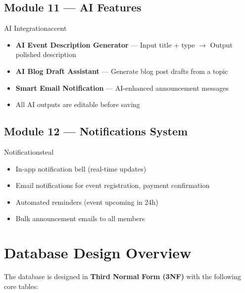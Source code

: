 \documentclass[12pt,a4paper]{article}
\begin{document}
\subsection{Module 11 --- AI Features}
\begin{modulebox}{AI Integration}{accent}
\begin{itemize}[leftmargin=*, itemsep=3pt]
  \item \textbf{AI Event Description Generator} --- Input title + type $\rightarrow$ Output polished description
  \item \textbf{AI Blog Draft Assistant} --- Generate blog post drafts from a topic
  \item \textbf{Smart Email Notification} --- AI-enhanced announcement messages
  \item All AI outputs are editable before saving
\end{itemize}
\end{modulebox}

\subsection{Module 12 --- Notifications System}
\begin{modulebox}{Notifications}{teal}
\begin{itemize}[leftmargin=*, itemsep=3pt]
  \item In-app notification bell (real-time updates)
  \item Email notifications for event registration, payment confirmation
  \item Automated reminders (event upcoming in 24h)
  \item Bulk announcement emails to all members
\end{itemize}
\end{modulebox}

\section{Database Design Overview}

The database is designed in \textbf{Third Normal Form (3NF)} with the following core tables:
\end{document}
